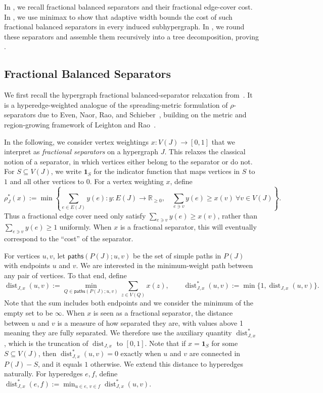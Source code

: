 \documentclass[11pt,letterpaper]{article}
\theoremstyle{definition}
\theoremstyle{remark}
\begin{document}
In , we recall fractional balanced separators and their fractional edge-cover cost.
In , we use minimax to show that adaptive width bounds the cost of such fractional balanced separators in every induced subhypergraph.
In , we round these separators and assemble them
recursively into a tree decomposition, proving .


\subsection{Fractional Balanced Separators}
\label{sec:separator-definitions}

We first recall the hypergraph fractional balanced-separator relaxation
from~\cite[Definition~5.2]{KorchemnaEtAl2024}. It is a hyperedge-weighted
analogue of the spreading-metric formulation of $\rho$-separators due to Even,
Naor, Rao, and Schieber~\cite{EvenNaorRaoSchieber1999}, building on the metric
and region-growing framework of Leighton and Rao~\cite{LeightonRao1999}.


In the following, we consider vertex weightings $x : V(J) \to [0,1]$ that we interpret as \emph{fractional separators} on a hypergraph $J$. This relaxes the classical notion of a separator, in which vertices either belong to the separator or do not. For $S \subseteq V(J)$, we write $\mathbf 1_S$ for the indicator function that maps vertices in $S$ to $1$ and all other vertices to $0$. For a vertex weighting $x$, define
\[
 \rho_J^*(x)
 :=\min\left\{
   \sum_{e\in E(J)}y(e):
   y:E(J)\to\mathbb R_{\ge0},\quad
   \sum_{e\ni v}y(e)\ge x(v)\ \forall v\in V(J)
 \right\}.
\]
Thus a fractional edge cover need only satisfy $\sum_{e\ni v}y(e)\ge x(v)$, rather than $\sum_{e\ni v}y(e)\ge 1$ uniformly. When $x$ is a fractional separator, this will eventually correspond to the ``cost'' of the separator.

For vertices $u,v$, let $\mathsf{paths}(P(J);u,v)$ be the set of simple
paths in $P(J)$ with endpoints $u$ and $v$.
We are interested in the minimum-weight path between any pair of vertices. To that end, define
\[
 \operatorname{dist}_{J,x}(u,v)
 :=\min_{Q\in\mathsf{paths}(P(J);u,v)}\sum_{z\in V(Q)}x(z),
 \qquad
 \operatorname{dist}_{J,x}^*(u,v)
 :=\min\{1,\operatorname{dist}_{J,x}(u,v)\}.
\]
Note that the sum includes both endpoints and we consider the minimum of the empty set to be $\infty$. When $x$ is seen as a fractional separator, the distance between $u$ and $v$ is a measure of how separated they are, with values above 1 meaning they are fully separated.
We therefore use the auxiliary quantity $\operatorname{dist}_{J,x}^*$, which is the truncation of $\operatorname{dist}_{J,x}$ to $[0,1]$. Note that if
$x=\mathbf 1_S$ for some $S\subseteq V(J)$, then
$\operatorname{dist}_{J,x}^*(u,v)=0$ exactly when $u$ and $v$ are connected in $P(J)-S$, and it equals $1$ otherwise.
%
We extend this distance to hyperedges naturally. For hyperedges $e,f$, define
\(
 \operatorname{dist}_{J,x}^*(e,f)
 :=\min_{u\in e,\,v\in f}\operatorname{dist}_{J,x}^*(u,v).
\)
\end{document}
